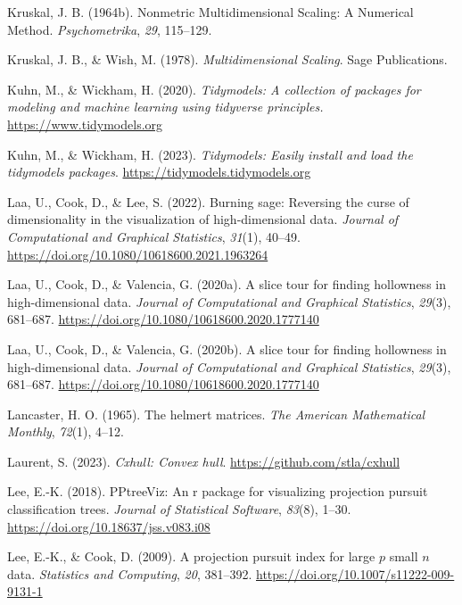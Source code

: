 \documentclass[
  letterpaper,
]{krantz}
\newlength{\cslhangindent}
\newenvironment{CSLReferences}[2] %
 {\begin{list}{}{%
  \setlength{\itemindent}{0pt}
  \setlength{\leftmargin}{0pt}
  \setlength{\parsep}{0pt}
  \ifodd #1
   \setlength{\leftmargin}{\cslhangindent}
   \setlength{\itemindent}{-1\cslhangindent}
  \fi
  \setlength{\itemsep}{#2\baselineskip}}}
 {\end{list}}
\begin{document}
\begin{CSLReferences}{1}{0}
Kruskal, J. B. (1964b). Nonmetric {M}ultidimensional {S}caling: A
{N}umerical {M}ethod. \emph{Psychometrika}, \emph{29}, 115--129.

Kruskal, J. B., \& Wish, M. (1978). \emph{Multidimensional {S}caling}.
Sage Publications.

Kuhn, M., \& Wickham, H. (2020). \emph{Tidymodels: A collection of
packages for modeling and machine learning using tidyverse principles.}
\url{https://www.tidymodels.org}

Kuhn, M., \& Wickham, H. (2023). \emph{Tidymodels: Easily install and
load the tidymodels packages}. \url{https://tidymodels.tidymodels.org}

Laa, U., Cook, D., \& Lee, S. (2022). Burning sage: Reversing the curse
of dimensionality in the visualization of high-dimensional data.
\emph{Journal of Computational and Graphical Statistics}, \emph{31}(1),
40--49. \url{https://doi.org/10.1080/10618600.2021.1963264}

Laa, U., Cook, D., \& Valencia, G. (2020a). A slice tour for finding
hollowness in high-dimensional data. \emph{Journal of Computational and
Graphical Statistics}, \emph{29}(3), 681--687.
\url{https://doi.org/10.1080/10618600.2020.1777140}

Laa, U., Cook, D., \& Valencia, G. (2020b). A slice tour for finding
hollowness in high-dimensional data. \emph{Journal of Computational and
Graphical Statistics}, \emph{29}(3), 681--687.
\url{https://doi.org/10.1080/10618600.2020.1777140}

Lancaster, H. O. (1965). The helmert matrices. \emph{The American
Mathematical Monthly}, \emph{72}(1), 4--12.

Laurent, S. (2023). \emph{Cxhull: Convex hull}.
\url{https://github.com/stla/cxhull}

Lee, E.-K. (2018). PPtreeViz: An r package for visualizing projection
pursuit classification trees. \emph{Journal of Statistical Software},
\emph{83}(8), 1--30. \url{https://doi.org/10.18637/jss.v083.i08}

Lee, E.-K., \& Cook, D. (2009). A projection pursuit index for large
\(p\) small \(n\) data. \emph{Statistics and Computing}, \emph{20},
381--392. \url{https://doi.org/10.1007/s11222-009-9131-1}


\end{CSLReferences}
\end{document}
